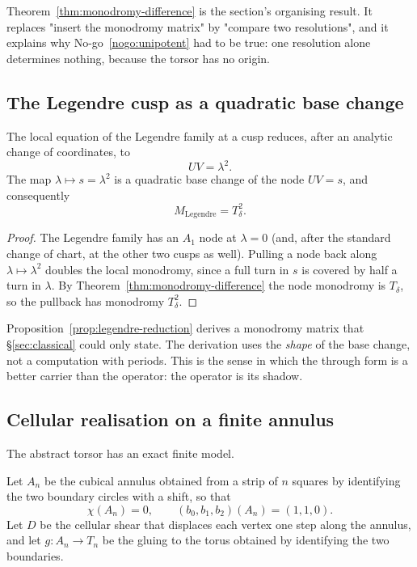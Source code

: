 \begin{remark}
Theorem~\ref{thm:monodromy-difference} is the section's organising result.  It replaces
"insert the monodromy matrix" by "compare two resolutions", and it explains why
No-go~\ref{nogo:unipotent} had to be true: one resolution alone determines nothing,
because the torsor has no origin.
\end{remark}

\subsection{The Legendre cusp as a quadratic base change}

\begin{proposition}\label{prop:legendre-reduction}
The local equation of the Legendre family at a cusp reduces, after an analytic change
of coordinates, to
\[
  UV=\lambda^{2}.
\]
The map $\lambda\mapsto s=\lambda^{2}$ is a quadratic base change of the node
$UV=s$, and consequently
\[
  M_{\mathrm{Legendre}}=T_\delta^{2}.
\]
\end{proposition}

\begin{proof}
The Legendre family has an $A_1$ node at $\lambda=0$ (and, after the standard change of
chart, at the other two cusps as well).  Pulling a node back along $\lambda\mapsto\lambda^{2}$
doubles the local monodromy, since a full turn in $s$ is covered by half a turn in
$\lambda$.  By Theorem~\ref{thm:monodromy-difference} the node monodromy is $T_\delta$,
so the pullback has monodromy $T_\delta^{2}$.
\end{proof}

\begin{remark}
Proposition~\ref{prop:legendre-reduction} derives a monodromy matrix that
\S\ref{sec:classical} could only state.  The derivation uses the \emph{shape} of the
base change, not a computation with periods.  This is the sense in which the through
form is a better carrier than the operator: the operator is its shadow.
\end{remark}

\subsection{Cellular realisation on a finite annulus}

The abstract torsor has an exact finite model.

\begin{construction}\label{con:cubical-annulus}
Let $A_n$ be the cubical annulus obtained from a strip of $n$ squares by identifying the
two boundary circles with a shift, so that
\[
  \chi(A_n)=0,\qquad (b_0,b_1,b_2)(A_n)=(1,1,0).
\]
Let $D$ be the cellular shear that displaces each vertex one step along the annulus, and
let $g\colon A_n\to T_n$ be the gluing to the torus obtained by identifying the two
boundaries.
\end{construction}

